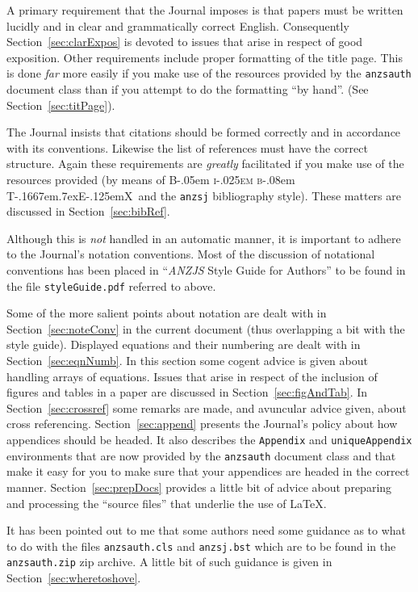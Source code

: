 \documentclass[times, doublespace]{anzsauth}
\newcommand\BibTeX{{\rmfamily B\kern-.05em \textsc{i\kern-.025em b}\kern-.08em
T\kern-.1667em\lower.7ex\hbox{E}\kern-.125emX}}
\begin{document}
A primary requirement that the Journal imposes is that papers must
be written lucidly and in clear and grammatically correct English.
Consequently Section~\ref{sec:clarExpos} is devoted to issues that
arise in respect of good exposition.  Other requirements include
proper formatting of the title page.  This is done \emph{far}
more easily if you make use of the resources provided by the
\texttt{anzsauth} document class than if you attempt to do the
formatting ``by hand''.  (See Section~\ref{sec:titPage}).

The Journal insists that citations should be formed correctly and in
accordance with its conventions.  Likewise the list of references
must have the correct structure.  Again these requirements are
\emph{greatly} facilitated if you make use of the resources provided
(by means of \BibTeX\ and the \texttt{anzsj} bibliography style).
These matters are discussed in Section~\ref{sec:bibRef}.

Although this is \emph{not} handled in an automatic manner,
it is important to adhere to the Journal's notation conventions.
Most of the discussion of notational conventions has been placed in
``{\textit{ANZJS} Style Guide for Authors}'' to be found in the
file \texttt{styleGuide.pdf} referred to above.

Some of the more salient points about notation are dealt with
in Section~\ref{sec:noteConv} in the current document (thus
overlapping a bit with the style guide).  Displayed equations
and their numbering are dealt with in Section~\ref{sec:eqnNumb}.
In this section some cogent advice is given about handling arrays of
equations.  Issues that arise in respect of the inclusion of figures
and tables in a paper are discussed in Section~\ref{sec:figAndTab}.
In Section~\ref{sec:crossref} some remarks are made, and avuncular
advice given, about cross referencing.  Section~\ref{sec:append}
presents the Journal's policy about how appendices should be headed.
It also describes the \texttt{Appendix} and \texttt{uniqueAppendix}
environments that are now provided by the \texttt{anzsauth} document
class and that make it easy for you to make sure that your appendices
are headed in the correct manner.  Section~\ref{sec:prepDocs}
provides a little bit of advice about preparing and processing the
``source files'' that underlie the use of \LaTeX.

It has been pointed out to me that some authors need some
guidance as to what to do with the files \texttt{anzsauth.cls} and
\texttt{anzsj.bst} which are to be found in the \texttt{anzsauth.zip}
zip archive.  A little bit of such guidance is given in
Section~\ref{sec:wheretoshove}.
\end{document}
